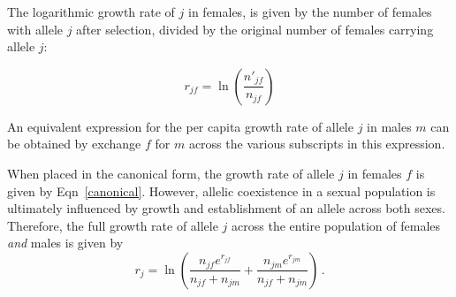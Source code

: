 The logarithmic growth rate of $j$ in females, is given by the number of females with allele $j$ after selection, divided by the original number of females carrying allele $j$:



\begin{equation}
    r_{jf} = \ln \left( \frac{n'_{jf}}{n_{jf}} \right)
    \label{canonical}
\end{equation}


An equivalent expression for the per capita growth rate of allele $j$ in males $m$ can be obtained by exchange $f$ for $m$ across the various subscripts in this expression.

When placed in the canonical form, the growth rate of allele $j$ in females $f$ is given by Eqn~\ref{canonical}. However, allelic coexistence in a sexual population is ultimately influenced by growth and establishment of an allele across both sexes. Therefore, the full growth rate of allele $j$ across the entire population of females \emph{and} males is given by
\begin{equation}
    r_{j} = \ln \left(  \frac{n_{jf}e^{r_{jf}}}{n_{jf} + n_{jm}}   +  \frac{n_{jm}e^{r_{{jm}}}}{n_{jf} + n_{jm}}  \right) \,.
    \label{full}
\end{equation}



